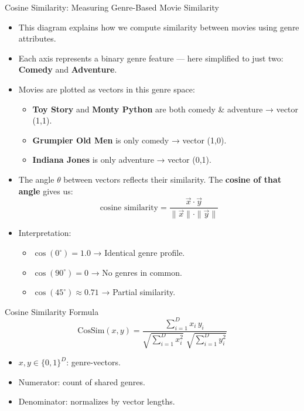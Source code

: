 \documentclass{beamer}
\begin{document}
\begin{frame}{Cosine Similarity: Measuring Genre-Based Movie Similarity}
\begin{itemize}
    \item This diagram explains how we compute similarity between movies using genre attributes.
    \item Each axis represents a binary genre feature — here simplified to just two: \textbf{Comedy} and \textbf{Adventure}.
    \item Movies are plotted as vectors in this genre space:
    \begin{itemize}
        \item \textbf{Toy Story} and \textbf{Monty Python} are both comedy \& adventure → vector (1,1).
        \item \textbf{Grumpier Old Men} is only comedy → vector (1,0).
        \item \textbf{Indiana Jones} is only adventure → vector (0,1).
    \end{itemize}
    \item The angle \(\theta\) between vectors reflects their similarity. The \textbf{cosine of that angle} gives us:
    \[
    \text{cosine similarity} = \frac{\vec{x} \cdot \vec{y}}{\|\vec{x}\| \cdot \|\vec{y}\|}
    \]
    \item Interpretation:
    \begin{itemize}
        \item \(\cos(0^\circ) = 1.0\) → Identical genre profile.
        \item \(\cos(90^\circ) = 0\) → No genres in common.
        \item \(\cos(45^\circ) \approx 0.71\) → Partial similarity.
    \end{itemize}
\end{itemize}
\end{frame}

\begin{frame}{Cosine Similarity Formula}
\[
\mathrm{CosSim}(x,y)
= \frac{\displaystyle\sum_{i=1}^{D} x_i\,y_i}
       {\sqrt{\displaystyle\sum_{i=1}^{D} x_i^2}\;\sqrt{\displaystyle\sum_{i=1}^{D} y_i^2}}
\]
\begin{itemize}
  \item $x,y\in\{0,1\}^D$: genre-vectors.
  \item Numerator: count of shared genres.
  \item Denominator: normalizes by vector lengths.
\end{itemize}
\end{frame}
\end{document}
